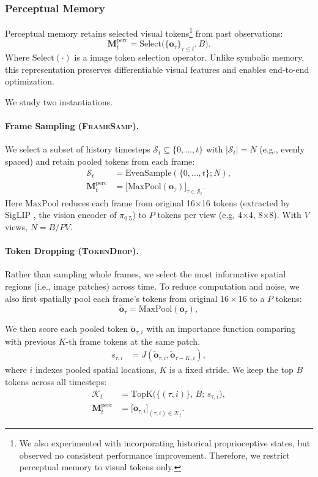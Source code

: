 \subsubsection{Perceptual Memory}

Perceptual memory retains selected visual tokens\footnote{We also experimented with incorporating historical proprioceptive states, but observed no consistent performance improvement. Therefore, we restrict perceptual memory to visual tokens only.} from past observations:
\[
\mathbf{M}_t^{\text{perc}}
=
\mathrm{Select}\big(\{\mathbf{o}_\tau\}_{\tau\le t}, B\big).
\]
Where $\mathrm{Select}(\cdot)$ is a image token selection operator.
Unlike symbolic memory, this representation preserves differentiable visual features and enables end-to-end optimization. 

We study two instantiations.

\paragraph{Frame Sampling (\textsc{FrameSamp}).}
We select a subset of history timesteps $\mathcal{S}_t \subseteq \{0,\dots,t\}$ with $|\mathcal{S}_t|=N$ (e.g., evenly spaced) and retain pooled tokens from each frame:
\begin{align}
\mathcal{S}_t &= \mathrm{EvenSample}(\{0,\dots,t\}; N),\\
\mathbf{M}_t^{\text{perc}}
&= \big[\mathrm{MaxPool}(\mathbf{o}_{\tau})\big]_{\tau \in \mathcal{S}_t}.
\end{align}
Here $\mathrm{MaxPool}$ reduces each frame from original 16$\times$16 tokens (extracted by SigLIP \cite{tschannen2025siglip}, the vision encoder of $\pi_{0.5}$) to $P$ tokens per view (e.g, 4$\times$4, 8$\times$8). With $V$ views, $N = B/PV$.


\paragraph{Token Dropping (\textsc{TokenDrop}).}
Rather than sampling whole frames, we select the most informative spatial regions (i.e., image patches) across time.
To reduce computation and noise, we also first spatially pool each frame's tokens from original $16{\times}16$ to a $P$ tokens:
\[
\tilde{\mathbf{o}}_\tau = \mathrm{MaxPool}(\mathbf{o}_\tau),
\]


We then score each pooled token $\tilde{\mathbf{o}}_{\tau,i}$ with an importance function comparing with previous $K$-th frame tokens at the same patch.
\begin{align}
s_{\tau,i} &= J(\tilde{\mathbf{o}}_{\tau,i}, \tilde{\mathbf{o}}_{\tau-K,i}),
\end{align}
where $i$ indexes pooled spatial locations, $K$ is a fixed stride.
We keep the top $B$ tokens across all timesteps:
\begin{align}
\mathcal{K}_t
&= \mathrm{TopK}\Big(\{(\tau,i)\},\, B;\, s_{\tau,i}\Big),\\
\mathbf{M}_t^{\text{perc}}
&= \big[\tilde{\mathbf{o}}_{\tau,i}\big]_{(\tau,i)\in \mathcal{K}_t}.
\end{align}

